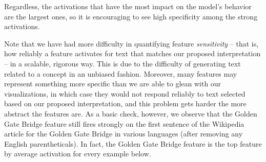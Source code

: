 \documentclass{article}
\begin{document}
Regardless, the activations that have the most impact on the model’s behavior are the largest ones, so it is encouraging to see high specificity among the strong activations.

Note that we have had more difficulty in quantifying feature \textit{sensitivity} -- that is, how reliably a feature activates for text that matches our proposed interpretation -- in a scalable, rigorous way. This is due to the difficulty of generating text related to a concept in an unbiased fashion. Moreover, many features may represent something more specific than we are able to glean with our visualizations, in which case they would not respond reliably to text selected based on our proposed interpretation, and this problem gets harder the more abstract the features are. As a basic check, however, we observe that the Golden Gate Bridge feature still fires strongly on the first sentence of the Wikipedia article for the Golden Gate Bridge in various languages (after removing any English parentheticals). In fact, the Golden Gate Bridge feature is the top feature by average activation for every example below.
\end{document}
